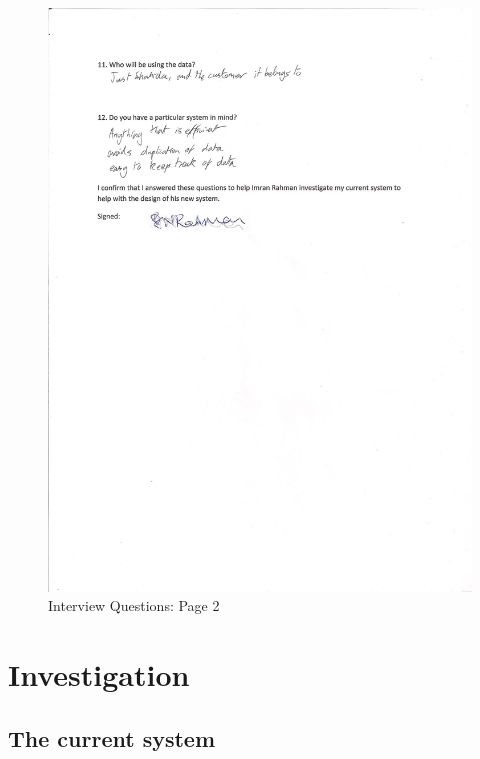 \begin{figure}[H]
    \includegraphics[width=\textwidth]{./Analysis/Interview_Questions_2.jpg}
    \caption{Interview Questions: Page 2} \label{Interview_Questions_2.jpg}
\end{figure}

\section{Investigation}

\subsection{The current system}

